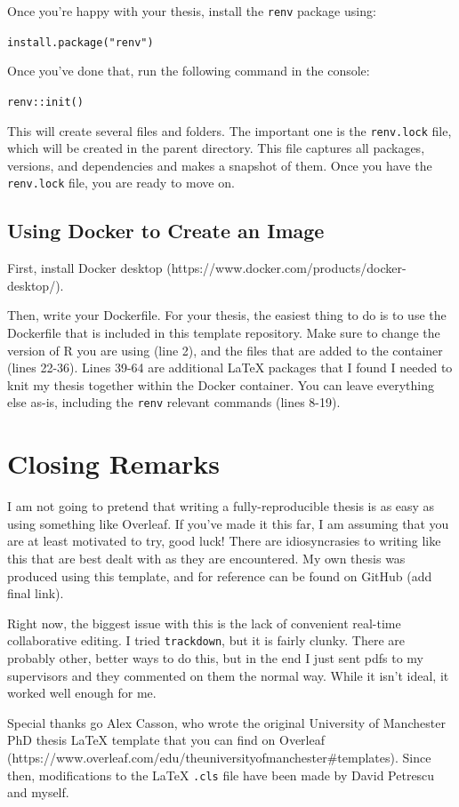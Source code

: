 \documentclass[../main.tex]{subfiles}
\begin{document}
Once you're happy with your thesis, install the \texttt{renv} package
using:

\texttt{install.package("renv")}

Once you've done that, run the following command in the console:

\texttt{renv::init()}

This will create several files and folders. The important one is the
\texttt{renv.lock} file, which will be created in the parent directory.
This file captures all packages, versions, and dependencies and makes a
snapshot of them. Once you have the \texttt{renv.lock} file, you are
ready to move on.

\subsection{Using Docker to Create an
Image}\label{using-docker-to-create-an-image}

First, install Docker desktop
(https://www.docker.com/products/docker-desktop/).

Then, write your Dockerfile. For your thesis, the easiest thing to do is
to use the Dockerfile that is included in this template repository. Make
sure to change the version of R you are using (line 2), and the files
that are added to the container (lines 22-36). Lines 39-64 are
additional LaTeX packages that I found I needed to knit my thesis
together within the Docker container. You can leave everything else
as-is, including the \texttt{renv} relevant commands (lines 8-19).

\section{Closing Remarks}\label{closing-remarks}

I am not going to pretend that writing a fully-reproducible thesis is as
easy as using something like Overleaf. If you've made it this far, I am
assuming that you are at least motivated to try, good luck! There are
idiosyncrasies to writing like this that are best dealt with as they are
encountered. My own thesis was produced using this template, and for
reference can be found on GitHub (add final link).

Right now, the biggest issue with this is the lack of convenient
real-time collaborative editing. I tried \texttt{trackdown}, but it is
fairly clunky. There are probably other, better ways to do this, but in
the end I just sent pdfs to my supervisors and they commented on them
the normal way. While it isn't ideal, it worked well enough for me.

Special thanks go Alex Casson, who wrote the original University of
Manchester PhD thesis LaTeX template that you can find on Overleaf
(https://www.overleaf.com/edu/theuniversityofmanchester\#templates).
Since then, modifications to the LaTeX \texttt{.cls} file have been made
by David Petrescu and myself.
\end{document}
